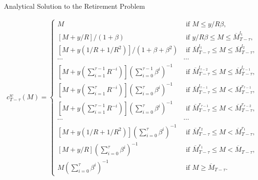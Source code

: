 \documentclass[aspectratio=169]{beamer}
\begin{document}
\begin{frame}{Analytical Solution to the Retirement Problem}\footnotesize
	
	\begin{theorem}
				
		\begin{equation}
			\label{7}
			\begin{aligned}
				c_{T- \tau}^w(M) = 
				\begin{cases}
					M & \text { if } M \leq y / R \beta, \\
					{[M+y / R] /(1+\beta)} & \text { if } y / R \beta \leq M \leq\overline{M}_{T-\tau}^{l_1}, \\
					{\left[M+y\left(1 / R+1 / R^2\right)\right] /\left(1+\beta+\beta^2\right)} &\text { if } \overline{M}_{T-\tau}^{l_1} \leq M \leq \overline{M}_{T-\tau}^{l_2}, \\
					\cdots & \cdots \\
					{\left[M+y\left(\sum_{i=1}^{\tau-1}R^{-i}\right)\right]\left(\sum_{i=0}^{\tau-1} \beta^i\right)^{-1}} & \text { if } \overline{M}_{T-\tau}^{l_{\tau-2}} \leq M \leq \overline{M}_{T-\tau}^{l_{\tau-1}}, \\
					{\left[M+y\left(\sum_{i=1}^\tau R^{-i}\right)\right]\left(\sum_{i=0}^\tau \beta^i\right)^{-1}} & \text { if } \overline{M}_{T-\tau}^{l_{\tau-1}} \leq M<\overline{M}_{T-\tau}^{r_{\tau-1}}, \\
					{\left[M+y\left(\sum_{i=1}^{\tau-1} R^{-i}\right)\right]\left(\sum_{i=0}^\tau \beta^i\right)^{-1}} & \text { if } \overline{M}_{T-\tau}^{r_{\tau-1}} \leq M<\overline{M}_{T-\tau}^{r_{\tau-2}}, \\
					\cdots & \cdots \\
					{\left[M+y\left(1 / R+1 / R^2\right)\right]\left(\sum_{i=0}^\tau\beta^i\right)^{-1}} & \text { if } \overline{M}_{T-\tau}^{r_2} \leq M<\overline{M}_{T-\tau}^{r_1}, \\
					{[M+y / R]\left(\sum_{i=0}^\tau \beta^i\right)^{-1}} & \text { if }\overline{M}_{T-\tau}^{r_1} \leq M<\overline{M}_{T-\tau}, \\
					{M\left(\sum_{i=0}^\tau \beta^i\right)^{-1}} & \text { if } M \geq\overline{M}_{T-\tau} .
				\end{cases}
			\end{aligned}
		\end{equation}
		
	\end{theorem}
\end{frame}
\end{document}
